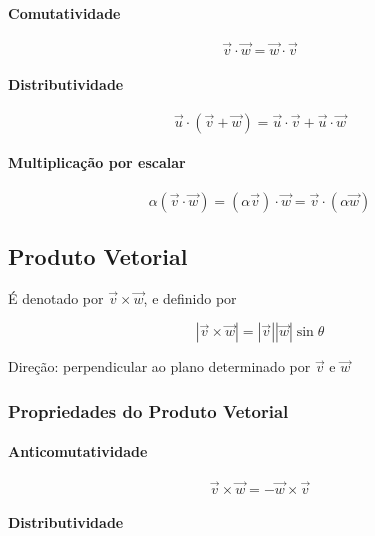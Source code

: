 \paragraph{Comutatividade}\label{comutatividade-1}

\[
\vec{v} \cdot \vec{w} = \vec{w} \cdot \vec{v}
\]

\paragraph{Distributividade}\label{distributividade-1}

\[
\vec{u} \cdot (\vec{v} + \vec{w}) = \vec{u} \cdot \vec{v} + \vec{u} \cdot \vec{w}
\]

\paragraph{Multiplicação por
escalar}\label{multiplicauxe7uxe3o-por-escalar}

\[
\alpha (\vec{v} \cdot \vec{w}) = (\alpha \vec{v}) \cdot \vec{w} = \vec{v} \cdot (\alpha \vec{w})
\]

\subsection{Produto Vetorial}\label{produto-vetorial}

É denotado por $\vec{v} \times \vec{w}$, e definido por

\[
|\vec{v} \times \vec{w}| = |\vec{v}| |\vec{w}| \sin \theta
\]

Direção: perpendicular ao plano determinado por $\vec{v}$ e $\vec{w}$

\subsubsection{Propriedades do Produto
Vetorial}\label{propriedades-do-produto-vetorial}

\paragraph{Anticomutatividade}\label{anticomutatividade}

\[
\vec{v} \times \vec{w} = - \vec{w} \times \vec{v}
\]

\paragraph{Distributividade}\label{distributividade-2}

